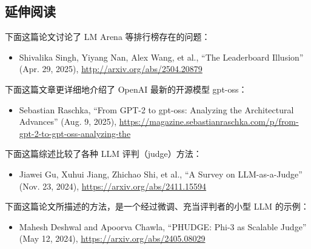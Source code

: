 \subsection{延伸阅读}

下面这篇论文讨论了 LM Arena 等排行榜存在的问题：

\begin{itemize}
\item Shivalika Singh, Yiyang Nan, Alex Wang, et al., “The Leaderboard Illusion” (Apr. 29, 2025), \href{http://arxiv.org/abs/2504.20879}{http://arxiv.org/abs/2504.20879}
\end{itemize}

下面这篇文章更详细地介绍了 OpenAI 最新的开源模型 gpt-oss：

\begin{itemize}
\item Sebastian Raschka, “From GPT-2 to gpt-oss: Analyzing the Architectural Advances” (Aug. 9, 2025), \href{https://magazine.sebastianraschka.com/p/from-gpt-2-to-gpt-oss-analyzing-the}{https://magazine.sebastianraschka.com/p/from-gpt-2-to-gpt-oss-analyzing-the}
\end{itemize}

下面这篇综述比较了各种 LLM 评判（judge）方法：

\begin{itemize}
\item Jiawei Gu, Xuhui Jiang, Zhichao Shi, et al., “A Survey on LLM-as-a-Judge” (Nov. 23, 2024), \href{https://arxiv.org/abs/2411.15594}{https://arxiv.org/abs/2411.15594}
\end{itemize}

下面这篇论文所描述的方法，是一个经过微调、充当评判者的小型 LLM 的示例：

\begin{itemize}
\item Mahesh Deshwal and Apoorva Chawla, “PHUDGE: Phi-3 as Scalable Judge” (May 12, 2024), \href{https://arxiv.org/abs/2405.08029}{https://arxiv.org/abs/2405.08029}
\end{itemize}
